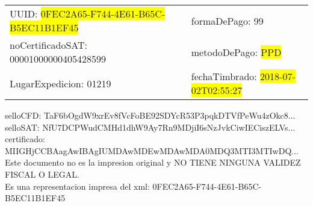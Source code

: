 \documentclass{article}
\begin{document}
\begin{tabular}{p{11cm}p{1cm}p{8cm}}
\bigskip
UUID: \colorbox{yellow}{ 0FEC2A65-F744-4E61-B65C-B5EC11B1EF45 } & & formaDePago: 99\\

noCertificadoSAT: 00001000000405428599 & & metodoDePago: \colorbox{yellow}{ PPD }\\

LugarExpedicion: 01219 & & fechaTimbrado: \colorbox{yellow}{ 2018-07-02T02:55:27 } \\
\end{tabular}

\bigskip
selloCFD: TaF6bOgdW9xrEv8fVcFoBE92SDYcR53P3pqkDTVfPeWu4zOkc8... \\
selloSAT: NfU7DCPWudCMHd1dhW9Ay7Rn9MDjiI6sNzJvkCiwIECiszELVs... \\

certificado: MIIGHjCCBAagAwIBAgIUMDAwMDEwMDAwMDA0MDQ3MTI3MTIwDQ...\bigskip\bigskip\bigskip\bigskip\bigskip\bigskip
\\Este documento no es la impresion original y NO TIENE NINGUNA VALIDEZ FISCAL O LEGAL. \\
 Es una representacion impresa del xml:  0FEC2A65-F744-4E61-B65C-B5EC11B1EF45 \\
\end{document}
